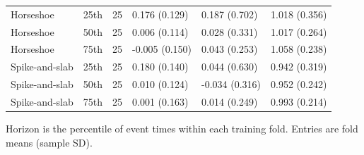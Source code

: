 \begin{longtable}{@{}>{\raggedright\arraybackslash}p{3.1cm}>{\raggedright\arraybackslash}p{1.3cm}p{0.5cm}p{2.9cm}p{2.9cm}p{2.9cm}@{}}
Horseshoe & 25th & 25 & 0.176 (0.129) & 0.187 (0.702) & 1.018 (0.356) \\
Horseshoe & 50th & 25 & 0.006 (0.114) & 0.028 (0.331) & 1.017 (0.264) \\
Horseshoe & 75th & 25 & -0.005 (0.150) & 0.043 (0.253) & 1.058 (0.238) \\
Spike-and-slab & 25th & 25 & 0.180 (0.140) & 0.044 (0.630) & 0.942 (0.319) \\
Spike-and-slab & 50th & 25 & 0.010 (0.124) & -0.034 (0.316) & 0.952 (0.242) \\
Spike-and-slab & 75th & 25 & 0.001 (0.163) & 0.014 (0.249) & 0.993 (0.214) \\
\end{longtable}
\noindent Horizon is the percentile of event times within each training fold. Entries are fold means (sample SD).\par\endgroup
\clearpage\begingroup\singlespacing\footnotesize
\setlength{\LTpre}{6pt}\setlength{\LTpost}{6pt}
